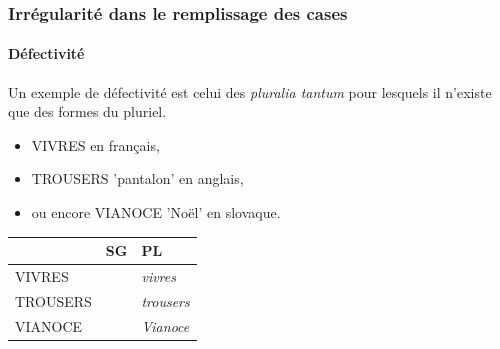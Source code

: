 



\begin{frame}
\frametitle{Irrégularité dans le remplissage des cases}
\framesubtitle{Défectivité}
\vspace{2ex}
Un exemple de défectivité est celui des {\em pluralia tantum}
pour lesquels il n'existe que des formes du pluriel.
\begin{itemize}
\item {\scriptsize{VIVRES}} en français,
\item {\scriptsize{TROUSERS}} 'pantalon' en anglais,
\item ou encore {\scriptsize{VIANOCE}} 'Noël' en slovaque.
\end{itemize}

\vspace{2ex}

\footnotesize
\begin{tabular}{lll}
&{\scriptsize{SG}}&{\scriptsize{PL}}\\
\hline
{\scriptsize{VIVRES}}&\cellcolor{black}&{\em vivres}\\[1ex]
{\scriptsize{TROUSERS}}&\cellcolor{black}&{\em trousers}\\[1ex]
{\scriptsize{VIANOCE}}&\cellcolor{black}&{\em Vianoce}\\[1ex]
\end{tabular}


\end{frame}




